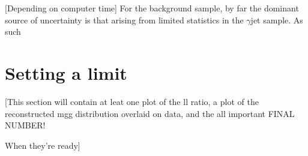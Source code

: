 [Depending on computer time]
For the background sample, by far the dominant source of uncertainty is that arising from limited statistics in the $\gamma$jet sample. As such

\section{Setting a limit}
[This section will contain at leat one plot of the ll ratio, a plot of the reconstructed mgg distribution overlaid on data, and the all important FINAL NUMBER!

When they're ready]

